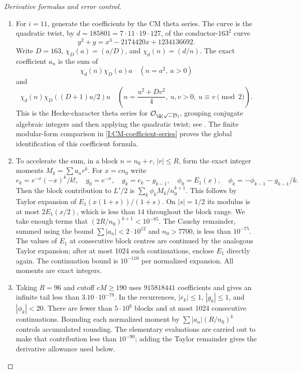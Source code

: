 \begin{proof}[Derivative formulas and error control]
\begin{enumerate}[label=\arabic*.,leftmargin=*]
\item For $i=11$, generate the coefficients by the CM theta series.
The curve is the quadratic twist, by
$d=185801=7\cdot11\cdot19\cdot127$, of the conductor-$163^2$
curve
\[
 y^2+y=x^3-2174420x+1234136692.
\]
Write $D=163$, $\chi_D(a)=(a/D)$, and $\chi_d(n)=(d/n)$.
The exact coefficient $a_n$ is the sum of
\[
 \chi_d(n)\chi_D(a)a \quad(n=a^2,\ a>0)
\]
and
\[
 \chi_d(n)\chi_D((D+1)u/2)u
 \quad\left(n=\frac{u^2+Dv^2}{4},\ u,v>0,
                           \ u\equiv v\pmod2\right).
\]
This is the Hecke-character theta series for
$\mathcal O_{\Q(\sqrt{-D})}$, grouping conjugate algebraic integers
and then applying the quadratic twist; see
\citet[\S3, pp.~4--5]{CrDarmon2009}. The finite modular-form comparison in \cref{I:CM-coefficient-series}
proves the global identification of this coefficient formula.

\item To accelerate the sum, in a block $n=n_0+r$, $|r|\leq R$, form the
exact integer moments $M_k=\sum a_nr^k$. For $x=cn_0$ write
\[
 e_k=e^{-x}(-x)^k/k!,\quad g_0=e^{-x},\quad
 g_k=e_k-g_{k-1},\quad
 \phi_0=E_1(x),\quad\phi_k=-\phi_{k-1}-g_{k-1}/k.
\]
Then the block contribution to $L'/2$ is
$\sum_k\phi_k M_k/n_0^{k+1}$. This follows by Taylor expansion
of $E_1(x(1+s))/(1+s)$. On $|s|=1/2$ its modulus is at most
$2E_1(x/2)$, which is less than $14$ throughout the block range.
We take enough terms that $(2R/n_0)^{k+1}<10^{-85}$.
The Cauchy remainder, summed using the bound
$\sum|a_n|<2\cdot10^{12}$ and $n_0>7700$, is less than
$10^{-75}$. The values of $E_1$ at consecutive block centres
are continued by the analogous Taylor expansion; after at most
1024 such continuations, enclose $E_1$ directly again.
The continuation bound is $10^{-110}$ per normalized expansion.
All moments are exact integers.

\item Taking $R=96$ and cutoff $cM\geq190$ uses
$915818441$ coefficients and gives an infinite tail less than
$3.10\cdot10^{-78}$. In the recurrences,
$|e_k|\leq1$, $|g_k|\leq1$, and $|\phi_k|<20$.
There are fewer than $5\cdot10^6$ blocks and at most 1024
consecutive continuations. Bounding each normalized moment by
$\sum|a_n|(R/n_0)^k$ controls accumulated rounding. The elementary evaluations are carried
out to make that contribution less than $10^{-90}$; adding the
Taylor remainder gives the derivative allowance used below.


\end{enumerate}
\end{proof}

